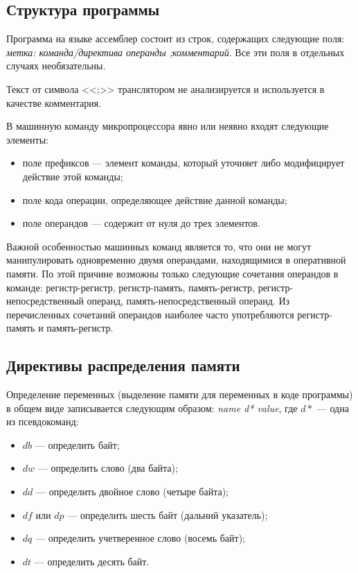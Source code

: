 \subsection{Структура программы}

Программа на языке ассемблер состоит из строк, содержащих следующие поля:
\textit{метка: команда/директива операнды ;комментарий}.
Все эти поля в отдельных случаях необязательны.

Текст от символа <<;>> транслятором не анализируется и используется
в качестве комментария.

В машинную команду микропроцессора явно или неявно входят следующие элементы:

\begin{itemize}
  \item поле префиксов --- элемент команды, который уточняет либо модифицирует действие этой
    команды;
  \item поле кода операции, определяющее действие данной команды;
  \item поле операндов --- содержит от нуля до трех элементов.
\end{itemize}

Важной особенностью машинных команд является то, что они не могут манипулировать
одновременно двумя операндами, находящимися в оперативной памяти. По этой причине
возможны только следующие сочетания операндов в команде:
регистр-регистр,
регистр-память,
память-регистр,
регистр-непосредственный операнд,
память-непосредственный операнд.
Из перечисленных сочетаний операндов наиболее часто употребляются регистр-память и
память-регистр.


\subsection{Директивы распределения памяти}

Определение переменных (выделение памяти для переменных в коде программы) в общем
виде записывается следующим образом: \textit{name d* value},
где $ d* $ --- одна из псевдокоманд:
\begin{itemize}
  \item $ db $ --- определить байт;
  \item $ dw $ --- определить слово (два байта);
  \item $ dd $ --- определить двойное слово (четыре байта);
  \item $ df $ или $ dp $ --- определить шесть байт (дальний указатель);
  \item $ dq $ --- определить учетверенное слово (восемь байт);
  \item $ dt $ --- определить десять байт.
\end{itemize}
